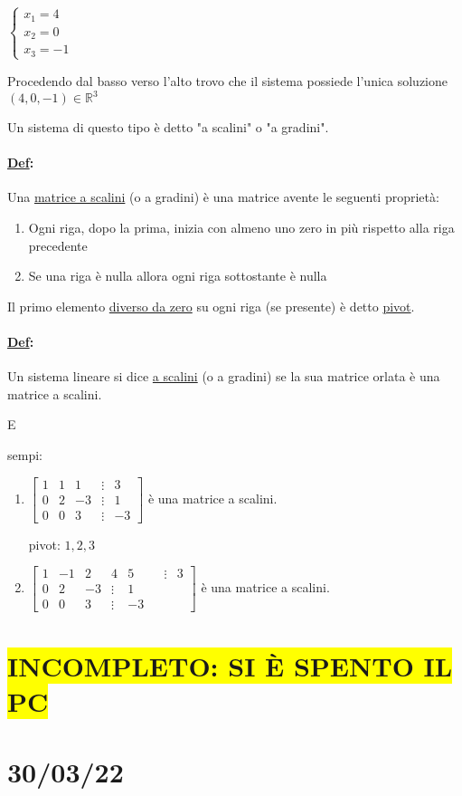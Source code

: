\documentclass{article}
\newcommand{\hl}[1]{\colorbox{yellow}{#1}}
\newcommand{\ul}[1]{\underline{#1}}
\newcommand{\R}{\mathbb{R}}
\newcommand{\Def}[2]{\paragraph{\ul{Def}:}#1\\\hspace*{3em}\begin{minipage}{.8\textwidth}#2\end{minipage}}
\begin{document}
$\begin{cases}
	x_1=4 \\
	x_2=0 \\
	x_3=-1
\end{cases}$

	Procedendo dal basso verso l'alto trovo che il sistema possiede l'unica soluzione $(4,0,-1)\in\R^3$

	Un sistema di questo tipo è detto "a scalini" o "a gradini".

	\Def{Una \ul{matrice a scalini} (o a gradini) è una matrice avente le seguenti proprietà:}{
		\begin{enumerate}
			\item Ogni riga, dopo la prima, inizia con almeno uno zero in più rispetto alla riga precedente
			\item Se una riga è nulla allora ogni riga sottostante è nulla
		\end{enumerate}
	}
	Il primo elemento \ul{diverso da zero} su ogni riga (se presente) è detto \ul{pivot}.

	\Def{ Un sistema lineare si dice \ul{a scalini} (o a gradini) se la sua matrice orlata è una matrice a scalini.}

	Esempi:
	\begin{enumerate}
		\item $\begin{bmatrix}
				      1 & 1 & 1  & \vdots & 3  \\
				      0 & 2 & -3 & \vdots & 1  \\
				      0 & 0 & 3  & \vdots & -3
			      \end{bmatrix}$ è una matrice a scalini.

		      pivot: $1,2,3$
		\item $\begin{bmatrix}
				      1 & -1 & 2  & 4      & 5  &  & \vdots & 3 \\
				      0 & 2  & -3 & \vdots & 1                  \\
				      0 & 0  & 3  & \vdots & -3
			      \end{bmatrix}$ è una matrice a scalini.
	\end{enumerate}
	\section*{\hl{INCOMPLETO: SI È SPENTO IL PC}}
	\section{30/03/22}
\end{document}

